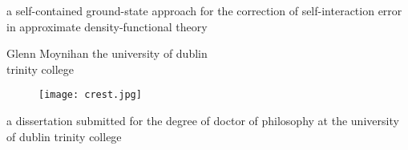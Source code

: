 \begin{titlepage}
\begin{center}


{ \LARGE \sc 
a self-contained  ground-state approach 
for the correction of self-interaction error  in  
approximate  density-functional  theory  
}


\vspace{30mm}

{\Large Glenn Moynihan} 
\medbreak
{\sc the university of dublin  \\ 
trinity college}


\vfill


\begin{figure}[H]
\center
\texttt{[image: crest.jpg]}
\end{figure}

\vfill


{\sc
a dissertation submitted for \break 
the degree  of doctor of philosophy at \break
the university of dublin \break 
trinity college 
}

\end{center}
\end{titlepage}